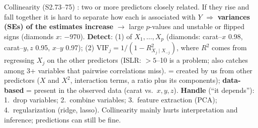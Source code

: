 \begin{topic}{Collinearity (S2.73--75)}
: two or more predictors closely related. If they rise and fall together it is hard to separate how each is associated with $Y$ $\Rightarrow$ \textbf{variances (SEs) of the estimates increase} $\to$ large $p$-values and unstable or flipped signs (diamonds $x$: $-970$).
\textbf{Detect}: (1)  of $X_1,\dots,X_p$ (diamonds: carat--$x$ 0.98, carat--$y,z$ 0.95, $x$--$y$ 0.97); (2)  $\mathrm{VIF}_j=1/(1-R^2_{X_j\mid X_{-j}})$, where $R^2$ comes from regressing $X_j$ on the other predictors (ISLR: $>5$--10 is a problem; also catches  among 3+ variables that pairwise correlations miss).
\textbf{} = created by us from other predictors ($X$ and $X^2$, interaction terms, a ratio plus its components); \textbf{data-based} = present in the observed data (carat vs.\ $x,y,z$).
\textbf{Handle} (``it depends''): 1.\ drop variables; 2.\ combine variables; 3.\ feature extraction (PCA); 4.\ regularization (ridge, lasso). Collinearity mainly hurts interpretation and inference; predictions can still be fine.
\end{topic}

